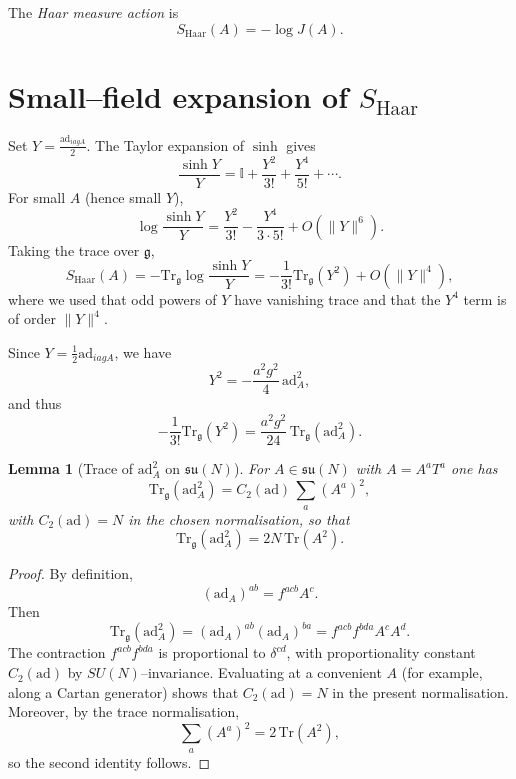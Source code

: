\documentclass[11pt]{article}
\numberwithin{equation}{section}
\newtheorem{lemma}[theorem]{Lemma}
\begin{document}
\begin{definition}
The \emph{Haar measure action} is
\[
  S_{\mathrm{Haar}}(A) = -\log J(A).
\]
\end{definition}

\section{Small--field expansion of $S_{\mathrm{Haar}}$}

Set $Y = \frac{\mathrm{ad}_{iagA}}{2}$.  The Taylor expansion of
$\sinh$ gives
\[
  \frac{\sinh Y}{Y} = \mathbb{I} + \frac{Y^2}{3!} + \frac{Y^4}{5!}
                      + \cdots.
\]
For small $A$ (hence small $Y$),
\[
  \log\frac{\sinh Y}{Y}
  = \frac{Y^2}{3!} - \frac{Y^4}{3\cdot 5!} + O(\|Y\|^6).
\]
Taking the trace over $\mathfrak{g}$,
\[
  S_{\mathrm{Haar}}(A)
  = -\mathrm{Tr}_{\mathfrak{g}}\log\frac{\sinh Y}{Y}
  = -\frac{1}{3!}\mathrm{Tr}_{\mathfrak{g}}(Y^2)
    + O(\|Y\|^4),
\]
where we used that odd powers of $Y$ have vanishing trace and that the
$Y^4$ term is of order $\|Y\|^4$.

Since $Y = \tfrac{1}{2}\mathrm{ad}_{iagA}$, we have
\[
  Y^2 = -\frac{a^2 g^2}{4}\,\mathrm{ad}_A^2,
\]
and thus
\[
  -\frac{1}{3!}\mathrm{Tr}_{\mathfrak{g}}(Y^2)
  = \frac{a^2 g^2}{24}\,\mathrm{Tr}_{\mathfrak{g}}(\mathrm{ad}_A^2).
\]

\begin{lemma}[Trace of $\mathrm{ad}_A^2$ on $\mathfrak{su}(N)$]
\label{lem:adA2-trace}
For $A\in\mathfrak{su}(N)$ with $A = A^a T^a$ one has
\[
  \mathrm{Tr}_{\mathfrak{g}}(\mathrm{ad}_A^2)
  = C_2(\mathrm{ad})\,\sum_a (A^a)^2,
\]
with $C_2(\mathrm{ad}) = N$ in the chosen normalisation, so that
\[
  \mathrm{Tr}_{\mathfrak{g}}(\mathrm{ad}_A^2)
  = 2N\,\mathrm{Tr}(A^2).
\]
\end{lemma}

\begin{proof}
By definition,
\[
  (\mathrm{ad}_A)^{ab} = f^{acb} A^c.
\]
Then
\[
  \mathrm{Tr}_{\mathfrak{g}}(\mathrm{ad}_A^2)
  = (\mathrm{ad}_A)^{ab}(\mathrm{ad}_A)^{ba}
  = f^{acb}f^{b d a} A^c A^d.
\]
The contraction $f^{acb}f^{b d a}$ is proportional to $\delta^{cd}$,
with proportionality constant $C_2(\mathrm{ad})$ by $SU(N)$--invariance.
Evaluating at a convenient $A$ (for example, along a Cartan generator)
shows that $C_2(\mathrm{ad}) = N$ in the present normalisation.
Moreover, by the trace normalisation,
\[
  \sum_a (A^a)^2 = 2\,\mathrm{Tr}(A^2),
\]
so the second identity follows.
\end{proof}
\end{document}
